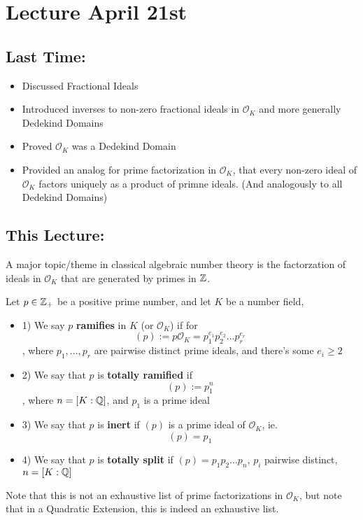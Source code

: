 \section{Lecture April 21st}

\subsection{Last Time:}

\begin{itemize}
    \item Discussed Fractional Ideals
    \item Introduced inverses to non-zero fractional ideals in $\mathcal{O}_K$ and more generally Dedekind Domains
    \item Proved $\mathcal{O}_K$ was a Dedekind Domain
    \item Provided an analog for prime factorization in $\mathcal{O}_K$, that every non-zero ideal of $\mathcal{O}_K$ factors uniquely as a product of primne ideals. (And analogously to all Dedekind Domains)
\end{itemize}

\subsection{This Lecture:}

A major topic/theme in classical algebraic number theory is the factorzation of ideals in $\mathcal{O}_K$ that are generated by primes in $\mathbb{Z}$.

\begin{definition}
Let $p \in \mathbb{Z}_+$ be a positive prime number, and let $K$ be a number field,
\begin{itemize}
    \item 1) We say $p$ \textbf{ramifies} in $K$ (or $\mathcal{O}_K$) if for 
    \[(p) := p \mathcal{O}_K = p_1^{e_1}p_2^{e_2}...p_r^{e_r}\]
    , where $p_1, ..., p_r$ are pairwise distinct prime ideals, and there's some $e_i \geq 2$
    \item 2) We say that $p$ is \textbf{totally ramified} if 
    \[(p) := p_1^n\]
    , where $n = [K: \mathbb{Q}]$, and $p_1$ is a prime ideal
    \item 3) We say that $p$ is \textbf{inert} if $(p)$ is a prime ideal of $\mathcal{O}_K$, ie.
    \[(p) = p_1\]
    \item 4) We say that $p$ is \textbf{totally split} if $(p) = p_1p_2...p_n$, $p_i$ pairwise distinct, $n = [K: \mathbb{Q}]$
\end{itemize}
Note that this is not an exhaustive list of prime factorizations in $\mathcal{O}_K$, but note that in a Quadratic Extension, this is indeed an exhaustive list.
\end{definition}

